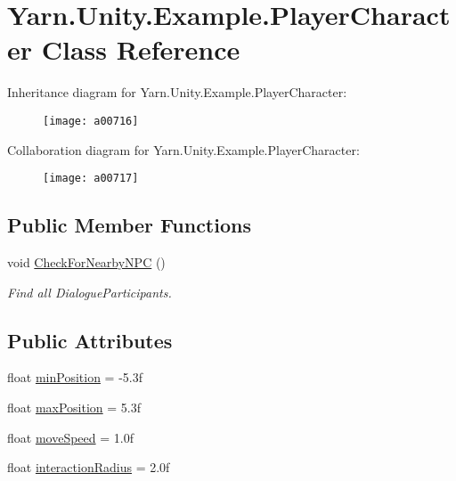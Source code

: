 \hypertarget{a00136}{\section{Yarn.\-Unity.\-Example.\-Player\-Character Class Reference}
\label{a00136}
}


Inheritance diagram for Yarn.\-Unity.\-Example.\-Player\-Character\-:
\nopagebreak
\begin{figure}[H]
\begin{center}
\leavevmode
\texttt{[image: a00716]}
\end{center}
\end{figure}


Collaboration diagram for Yarn.\-Unity.\-Example.\-Player\-Character\-:
\nopagebreak
\begin{figure}[H]
\begin{center}
\leavevmode
\texttt{[image: a00717]}
\end{center}
\end{figure}
\subsection*{Public Member Functions}
\begin{DoxyCompactItemize}
\item 
void \hyperlink{a00136_a574b6d984b8671c7a780d3d10e040a9b}{Check\-For\-Nearby\-N\-P\-C} ()
\begin{DoxyCompactList}\small\item\em Find all Dialogue\-Participants. \end{DoxyCompactList}\end{DoxyCompactItemize}
\subsection*{Public Attributes}
\begin{DoxyCompactItemize}
\item 
float \hyperlink{a00136_ac025d4f4afaf854f8256e0d2d03e5b52}{min\-Position} = -\/5.\-3f
\item 
float \hyperlink{a00136_ada9dd748a1d89a7f9b12ac8967a07ae6}{max\-Position} = 5.\-3f
\item 
float \hyperlink{a00136_adc602a4b2c7e44e4b15a11f1ffcf07e4}{move\-Speed} = 1.\-0f
\item 
float \hyperlink{a00136_af89807d2195915ee9a0c42317e110fc6}{interaction\-Radius} = 2.\-0f
\end{DoxyCompactItemize}
